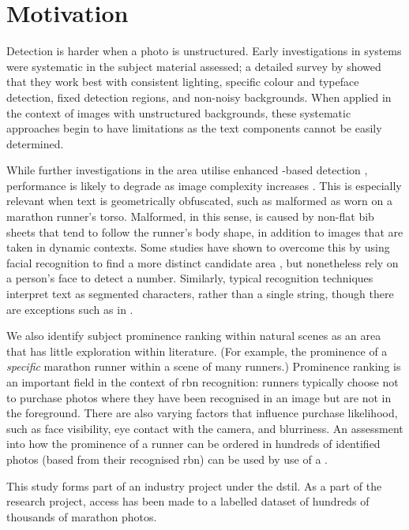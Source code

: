 \section{Motivation}
\label{sec:introduction:motivation}

Detection is harder when a photo is unstructured. Early investigations in  systems were systematic in the subject material assessed; a detailed survey by \citet{Anagnostopoulos:2008vu} showed that they work best  with consistent lighting, specific colour and typeface detection, fixed detection regions, and non-noisy backgrounds. When applied in the context of images with unstructured backgrounds, these systematic approaches begin to have limitations as the text components cannot be easily determined.

While further investigations in the area utilise enhanced -based detection \citep{Chen:2011ul,Shivakumara:2011dn,Epshtein:2010tj}, performance is likely to degrade as image complexity increases \citep{Li:2012wd}. This is especially relevant when text is geometrically obfuscated, such as malformed  as worn on a marathon runner's torso. Malformed, in this sense, is caused by non-flat bib sheets that tend to follow the runner's body shape, in addition to images that are taken in dynamic contexts. Some studies have shown to overcome this by using facial recognition to find a more distinct candidate area \citep{Benami:2012jf}, but nonetheless rely on a person's face to detect a number. Similarly, typical recognition techniques interpret text as segmented characters, rather than a single string, though there are exceptions such as in \citet{Zhu:2016ut}.

We also identify subject prominence ranking within natural scenes as an area that has little exploration within literature. (For example, the prominence of a \textit{specific} marathon runner within a scene of many runners.) Prominence ranking is an important field in the context of \gls{rbn} recognition: runners typically choose not to purchase photos where they have been recognised in an image but are not in the foreground. There are also varying factors that influence purchase likelihood, such as face visibility, eye contact with the camera, and blurriness. An assessment into how the prominence of a runner can be ordered in hundreds of identified photos (based from their recognised \gls{rbn}) can be used by use of a .

This study forms part of an industry project under the \gls{dstil}. As a part of the research project, access has been made to a labelled dataset of hundreds of thousands of marathon photos.

